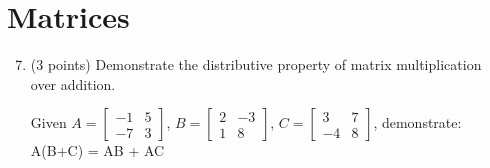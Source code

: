 \documentclass{article}%
\begin{document}
\section*{Matrices}
\begin{enumerate}
  \setcounter{enumi}{6}
    \item (3 points) Demonstrate the distributive property of matrix multiplication over addition. 
    
    Given $A = \begin{bmatrix}  -1 & 5 \\ -7 & 3\end{bmatrix}$, $B = \begin{bmatrix}  2 & -3 \\ 1 & 8\end{bmatrix}$, $C = \begin{bmatrix}  3 & 7 \\ -4 & 8\end{bmatrix}$, demonstrate: A(B+C) = AB + AC \vspace{2ex} 



\end{enumerate}
\end{document}
